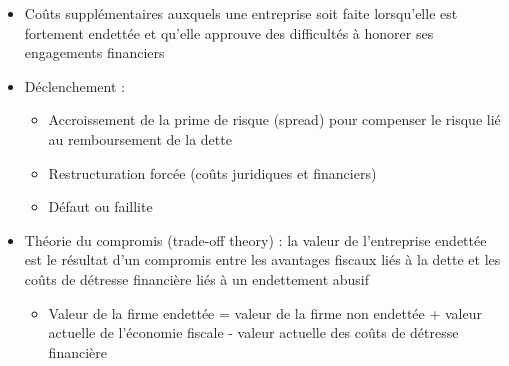\begin{itemize}
    \item Coûts supplémentaires auxquels une entreprise soit faite lorsqu'elle est fortement endettée et qu'elle approuve des difficultés à honorer ses engagements financiers
    \item Déclenchement :
    \begin{itemize}
        \item Accroissement de la prime de risque (spread) pour compenser le risque lié au remboursement de la dette
        \item Restructuration forcée (coûts juridiques et financiers)
        \item Défaut ou faillite
    \end{itemize}
    \item Théorie du compromis (trade-off theory) : la valeur de l'entreprise endettée est le résultat d'un compromis entre les avantages fiscaux liés à la dette et les coûts de détresse financière liés à un endettement abusif
    \begin{itemize}
        \item Valeur de la firme endettée = valeur de la firme non endettée + valeur actuelle de l'économie fiscale - valeur actuelle des coûts de détresse financière
    \end{itemize}
\end{itemize}

